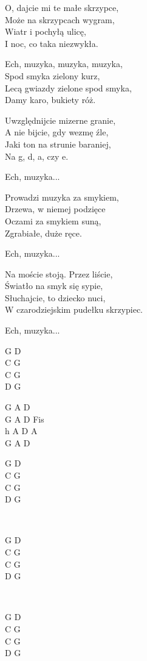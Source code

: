 \begin{text}
    O, dajcie mi te małe skrzypce,\\
    Może na skrzypcach wygram,\\
    Wiatr i pochyłą ulicę,\\
    I noc, co taka niezwykła.

    \vin Ech, muzyka, muzyka, muzyka,\\
    \vin Spod smyka zielony kurz,\\
    \vin Lecą gwiazdy zielone spod smyka,\\
    \vin Damy karo, bukiety róż.

    Uwzględnijcie mizerne granie,\\
    A nie bijcie, gdy wezmę źle,\\
    Jaki ton na strunie baraniej,\\
    Na g, d, a, czy e.

    \vin Ech, muzyka...

    Prowadzi muzyka za smykiem,\\
    Drzewa, w niemej podzięce\\
    Oczami za smykiem suną,\\
    Zgrabiałe, duże ręce.

    \vin Ech, muzyka...

    Na moście stoją. Przez liście,\\
    Światło na smyk się sypie,\\
    Słuchajcie, to dziecko nuci,\\
    W czarodziejskim pudełku skrzypiec.
    
    \vin Ech, muzyka...
\end{text}
\begin{chord}
    G D\\
    C G\\
    C G\\
    D G

    G A D\\
    G A D Fis\\
    h A D A\\
    G A D
    
    G D\\
    C G\\
    C G\\
    D G

    ~

    G D\\
    C G\\
    C G\\
    D G

    ~

    G D\\
    C G\\
    C G\\
    D G
\end{chord}